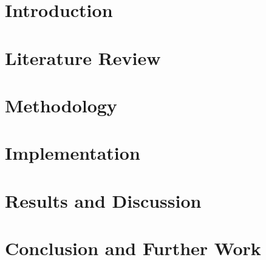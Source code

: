 
\chapter*{Introduction}

\newpage

\chapter{Literature Review}

\newpage

\chapter{Methodology}

\newpage

\chapter{Implementation}

\newpage

\chapter{Results and Discussion}

\newpage

\chapter{Conclusion and Further Work}


\appendix
